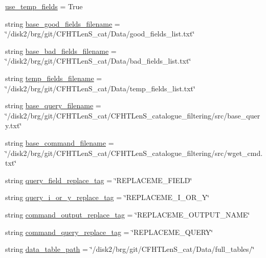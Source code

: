 \begin{DoxyCompactItemize}
\item 
\hyperlink{namespaceget__fields_ae435259fd2d90d5c6fb2f274152bf709}{use\-\_\-temp\-\_\-fields} = True
\item 
string \hyperlink{namespaceget__fields_a5413e2f327709f8e208c1dab85df5d0e}{base\-\_\-good\-\_\-fields\-\_\-filename} = \char`\"{}/disk2/brg/git/C\-F\-H\-T\-Len\-S\-\_\-cat/Data/good\-\_\-fields\-\_\-list.\-txt\char`\"{}
\item 
string \hyperlink{namespaceget__fields_a871b69f17f4070904d2d3de401f38661}{base\-\_\-bad\-\_\-fields\-\_\-filename} = \char`\"{}/disk2/brg/git/C\-F\-H\-T\-Len\-S\-\_\-cat/Data/bad\-\_\-fields\-\_\-list.\-txt\char`\"{}
\item 
string \hyperlink{namespaceget__fields_ae514686f8470f3add83948b4d065b08a}{temp\-\_\-fields\-\_\-filename} = \char`\"{}/disk2/brg/git/C\-F\-H\-T\-Len\-S\-\_\-cat/Data/temp\-\_\-fields\-\_\-list.\-txt\char`\"{}
\item 
string \hyperlink{namespaceget__fields_a9587d8f9ee4720e9bb81860a640ac39b}{base\-\_\-query\-\_\-filename} = \char`\"{}/disk2/brg/git/C\-F\-H\-T\-Len\-S\-\_\-cat/C\-F\-H\-T\-Len\-S\-\_\-catalogue\-\_\-filtering/src/base\-\_\-query.\-txt\char`\"{}
\item 
string \hyperlink{namespaceget__fields_ad7c6e2d33547d159fcf394b223c33818}{base\-\_\-command\-\_\-filename} = \char`\"{}/disk2/brg/git/C\-F\-H\-T\-Len\-S\-\_\-cat/C\-F\-H\-T\-Len\-S\-\_\-catalogue\-\_\-filtering/src/wget\-\_\-cmd.\-txt\char`\"{}
\item 
string \hyperlink{namespaceget__fields_aaf64ac2680c5eb87d093a9001b30cf6e}{query\-\_\-field\-\_\-replace\-\_\-tag} = \char`\"{}R\-E\-P\-L\-A\-C\-E\-M\-E\-\_\-\-F\-I\-E\-L\-D\char`\"{}
\item 
string \hyperlink{namespaceget__fields_affc74620547f037f75fe790e1779c8e3}{query\-\_\-i\-\_\-or\-\_\-y\-\_\-replace\-\_\-tag} = \char`\"{}R\-E\-P\-L\-A\-C\-E\-M\-E\-\_\-\-I\-\_\-\-O\-R\-\_\-\-Y\char`\"{}
\item 
string \hyperlink{namespaceget__fields_a0572e63507c66f3685c2669d693b03a1}{command\-\_\-output\-\_\-replace\-\_\-tag} = \char`\"{}R\-E\-P\-L\-A\-C\-E\-M\-E\-\_\-\-O\-U\-T\-P\-U\-T\-\_\-\-N\-A\-M\-E\char`\"{}
\item 
string \hyperlink{namespaceget__fields_ad7d8141db83615ef069528508f4a03b5}{command\-\_\-query\-\_\-replace\-\_\-tag} = \char`\"{}R\-E\-P\-L\-A\-C\-E\-M\-E\-\_\-\-Q\-U\-E\-R\-Y\char`\"{}
\item 
string \hyperlink{namespaceget__fields_a848c48da5f70314c4ee5700eb981a768}{data\-\_\-table\-\_\-path} = \char`\"{}/disk2/brg/git/C\-F\-H\-T\-Len\-S\-\_\-cat/Data/full\-\_\-tables/\char`\"{}
\end{DoxyCompactItemize}


